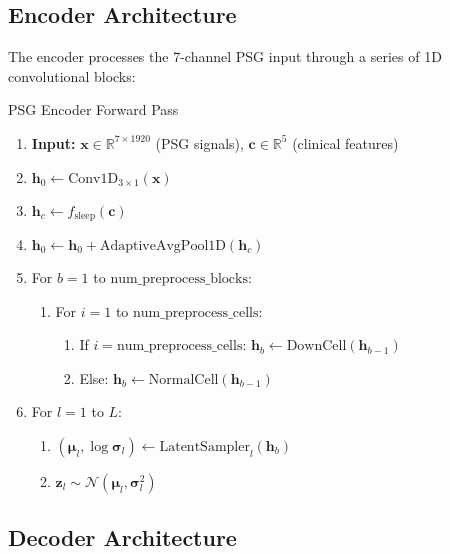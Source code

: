 \documentclass[11pt]{article}
\begin{document}
\subsection{Encoder Architecture}

The encoder processes the 7-channel PSG input through a series of 1D convolutional blocks:

\begin{algorithm}
\caption{PSG Encoder Forward Pass}
\label{alg:encoder}
\begin{enumerate}
\item \textbf{Input:} $\mathbf{x} \in \mathbb{R}^{7 \times 1920}$ (PSG signals), $\mathbf{c} \in \mathbb{R}^{5}$ (clinical features)
\item $\mathbf{h}_0 \leftarrow \text{Conv1D}_{3 \times 1}(\mathbf{x})$ 
\item $\mathbf{h}_c \leftarrow f_{\text{sleep}}(\mathbf{c})$ 
\item $\mathbf{h}_0 \leftarrow \mathbf{h}_0 + \text{AdaptiveAvgPool1D}(\mathbf{h}_c)$
\item For $b = 1$ to $\text{num\_preprocess\_blocks}$:
    \begin{enumerate}
    \item For $i = 1$ to $\text{num\_preprocess\_cells}$:
        \begin{enumerate}
        \item If $i = \text{num\_preprocess\_cells}$: $\mathbf{h}_b \leftarrow \text{DownCell}(\mathbf{h}_{b-1})$ 
        \item Else: $\mathbf{h}_b \leftarrow \text{NormalCell}(\mathbf{h}_{b-1})$ 
        \end{enumerate}
    \end{enumerate}
\item For $l = 1$ to $L$:
    \begin{enumerate}
    \item $(\boldsymbol{\mu}_l, \log \boldsymbol{\sigma}_l) \leftarrow \text{LatentSampler}_l(\mathbf{h}_b)$
    \item $\mathbf{z}_l \sim \mathcal{N}(\boldsymbol{\mu}_l, \boldsymbol{\sigma}_l^2)$
    \end{enumerate}
\end{enumerate}
\end{algorithm}

\subsection{Decoder Architecture}
\end{document}
